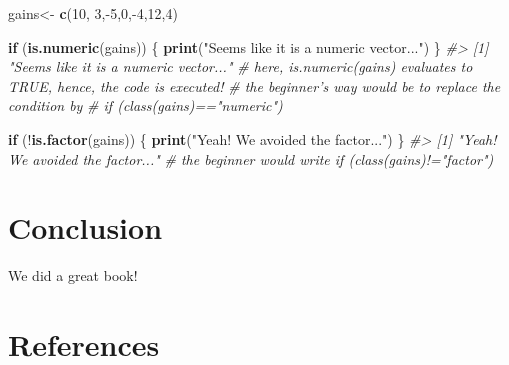\documentclass[]{book}
\newenvironment{Shaded}{}{}
\newcommand{\CommentTok}[1]{\textcolor[rgb]{0.38,0.63,0.69}{\textit{#1}}}
\newcommand{\ControlFlowTok}[1]{\textcolor[rgb]{0.00,0.44,0.13}{\textbf{#1}}}
\newcommand{\DecValTok}[1]{\textcolor[rgb]{0.25,0.63,0.44}{#1}}
\newcommand{\KeywordTok}[1]{\textcolor[rgb]{0.00,0.44,0.13}{\textbf{#1}}}
\newcommand{\NormalTok}[1]{#1}
\newcommand{\OperatorTok}[1]{\textcolor[rgb]{0.40,0.40,0.40}{#1}}
\newcommand{\StringTok}[1]{\textcolor[rgb]{0.25,0.44,0.63}{#1}}
\theoremstyle{definition}
\theoremstyle{definition}
\theoremstyle{definition}
\theoremstyle{remark}
\begin{document}
\begin{Shaded}
\begin{Highlighting}[]
\NormalTok{gains<-}\StringTok{ }\KeywordTok{c}\NormalTok{(}\DecValTok{10}\NormalTok{, }\DecValTok{3}\NormalTok{,}\OperatorTok{-}\DecValTok{5}\NormalTok{,}\DecValTok{0}\NormalTok{,}\OperatorTok{-}\DecValTok{4}\NormalTok{,}\DecValTok{12}\NormalTok{,}\DecValTok{4}\NormalTok{)}

\ControlFlowTok{if}\NormalTok{ (}\KeywordTok{is.numeric}\NormalTok{(gains)) \{}
  \KeywordTok{print}\NormalTok{(}\StringTok{"Seems like it is a numeric vector..."}\NormalTok{)}
\NormalTok{\}}
\CommentTok{#> [1] "Seems like it is a numeric vector..."}
\CommentTok{# here, is.numeric(gains) evaluates to TRUE, hence, the code is executed!}
\CommentTok{# the beginner's way would be to replace the condition by}
\CommentTok{# if (class(gains)=="numeric")}

\ControlFlowTok{if}\NormalTok{ (}\OperatorTok{!}\KeywordTok{is.factor}\NormalTok{(gains)) \{}
  \KeywordTok{print}\NormalTok{(}\StringTok{"Yeah! We avoided the factor..."}\NormalTok{)}
\NormalTok{\}}
\CommentTok{#> [1] "Yeah! We avoided the factor..."}
\CommentTok{# the beginner would write if (class(gains)!="factor")}
\end{Highlighting}
\end{Shaded}

\hypertarget{conclusion}{%
\chapter{Conclusion}\label{conclusion}}

We did a great book!

\hypertarget{references}{%
\chapter*{References}\label{references}}


\end{document}
